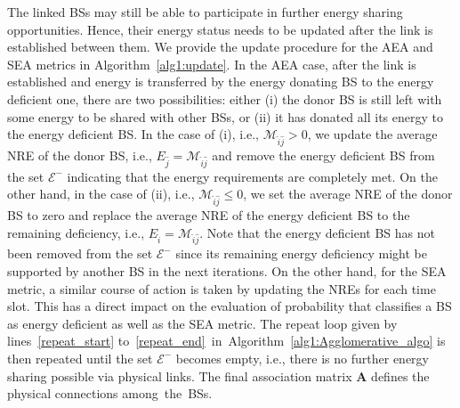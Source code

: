 \documentclass[10pt, letter,twocolumn]{IEEEtran}
\begin{document}
The linked BSs may still be able to participate in further energy sharing opportunities. Hence, their energy status needs to be updated after the link is established between them. We provide the update procedure for the AEA and SEA metrics in Algorithm~\ref{alg1:update}. In the AEA case, after the link is established and energy is transferred by the energy donating BS to the energy deficient one, there are two possibilities: either (i) the donor BS is still left with some energy to be shared with other BSs, or (ii) it has donated all its energy to the energy deficient BS. In the case of (i), i.e., $\mathcal{M}_{\hat{i}\hat{j}} > 0$, we update the average NRE of the donor BS, i.e., $E_{\hat{j}} = \mathcal{M}_{\hat{i}\hat{j}}$ and remove the energy deficient BS from the set $\mathcal{E}^{-}$ indicating that the energy requirements are completely met. On the other hand, in the case of (ii), i.e., $\mathcal{M}_{\hat{i}\hat{j}} \leq 0$, we set the average NRE of the donor BS to zero and replace the average NRE of the energy deficient BS to the remaining deficiency, i.e., $E_{\hat{i}} = \mathcal{M}_{\hat{i}\hat{j}}$. Note that the energy deficient BS has not been removed from the set $\mathcal{E}^{-}$ since its remaining energy deficiency might be supported by another BS in the next iterations. On the other hand, for the SEA metric, a similar course of action is taken by updating the NREs for each time slot. This has a direct impact on the evaluation of probability that classifies a BS as energy deficient as well as the SEA metric. The repeat loop given by lines~\ref{repeat_start} to~\ref{repeat_end}~in~Algorithm~\ref{alg1:Agglomerative_algo} is then repeated until the set $\mathcal{E}^{-}$ becomes empty, i.e., there is no further energy sharing possible via physical links. The final association matrix $\mathbf{A}$ defines the physical connections among~the~BSs.

\end{document}
